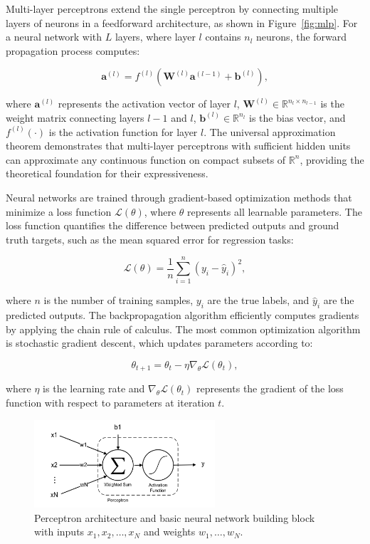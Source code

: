 Multi-layer perceptrons extend the single perceptron by connecting multiple layers of neurons in a feedforward architecture, as shown in Figure~\ref{fig:mlp}. For a neural network with $L$ layers, where layer $l$ contains $n_l$ neurons, the forward propagation process computes:

\begin{equation}
\mathbf{a}^{(l)} = f^{(l)}\left(\mathbf{W}^{(l)}\mathbf{a}^{(l-1)} + \mathbf{b}^{(l)}\right),
\end{equation}

where $\mathbf{a}^{(l)}$ represents the activation vector of layer $l$, $\mathbf{W}^{(l)} \in \mathbb{R}^{n_l \times n_{l-1}}$ is the weight matrix connecting layers $l-1$ and $l$, $\mathbf{b}^{(l)} \in \mathbb{R}^{n_l}$ is the bias vector, and $f^{(l)}(\cdot)$ is the activation function for layer $l$. The universal approximation theorem demonstrates that multi-layer perceptrons with sufficient hidden units can approximate any continuous function on compact subsets of $\mathbb{R}^n$, providing the theoretical foundation for their expressiveness.

Neural networks are trained through gradient-based optimization methods that minimize a loss function $\mathcal{L}(\theta)$, where $\theta$ represents all learnable parameters. The loss function quantifies the difference between predicted outputs and ground truth targets, such as the mean squared error for regression tasks:

\begin{equation}
\mathcal{L}(\theta) = \frac{1}{n}\sum_{i=1}^{n}(y_i - \hat{y}_i)^2,
\end{equation}

where $n$ is the number of training samples, $y_i$ are the true labels, and $\hat{y}_i$ are the predicted outputs. The backpropagation algorithm efficiently computes gradients by applying the chain rule of calculus. The most common optimization algorithm is stochastic gradient descent, which updates parameters according to:

\begin{equation}
\theta_{t+1} = \theta_t - \eta \nabla_\theta \mathcal{L}(\theta_t),
\end{equation}

where $\eta$ is the learning rate and $\nabla_\theta \mathcal{L}(\theta_t)$ represents the gradient of the loss function with respect to parameters at iteration $t$.

\begin{figure}[t]
\centering
\includegraphics[width=0.6\textwidth]{Images/perceptron.png}
\caption{Perceptron architecture and basic neural network building block with inputs $x_1, x_2, \ldots, x_N$ and weights $w_1, \ldots, w_N$.}
\label{fig:perceptron}
\end{figure}

